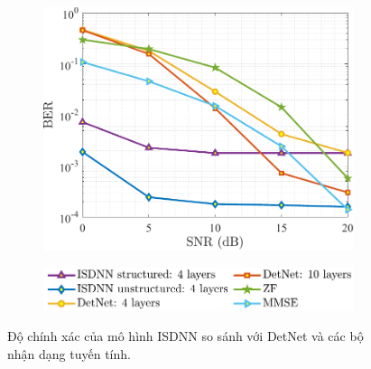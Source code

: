 \begin{figure}[ht]
    \centering
    \begin{subfigure}{\linewidth}
        \includegraphics[width=\linewidth]{figures/performance_1.pdf}
    \end{subfigure}
    \hfill
    \begin{subfigure}{\linewidth}
        \centering
        \includegraphics[width=.8\linewidth]{figures/lg_performance_1.pdf}
    \end{subfigure}
    \caption{Độ chính xác của mô hình ISDNN so sánh với DetNet và các bộ nhận dạng tuyến tính.}
    \label{fig:isdnn}
\end{figure}


